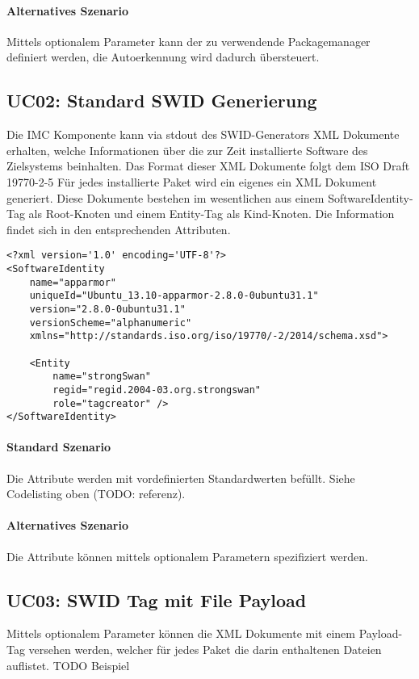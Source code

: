 \paragraph{Alternatives Szenario}
Mittels optionalem Parameter kann der zu verwendende Packagemanager definiert
werden, die Autoerkennung wird dadurch übersteuert.

\subsection{UC02: Standard SWID Generierung}

Die IMC Komponente kann via stdout des SWID-Generators XML Dokumente erhalten, welche Informationen über die zur Zeit installierte Software des Zielsystems beinhalten.
Das Format dieser XML Dokumente folgt dem ISO Draft 19770-2-5
Für jedes installierte Paket wird ein eigenes ein XML Dokument generiert.
Diese Dokumente bestehen im wesentlichen aus einem SoftwareIdentity-Tag als Root-Knoten und einem Entity-Tag als Kind-Knoten. Die Information findet sich in den entsprechenden Attributen.

\begin{verbatim}
<?xml version='1.0' encoding='UTF-8'?>
<SoftwareIdentity
    name="apparmor"
    uniqueId="Ubuntu_13.10-apparmor-2.8.0-0ubuntu31.1"
    version="2.8.0-0ubuntu31.1"
    versionScheme="alphanumeric"
    xmlns="http://standards.iso.org/iso/19770/-2/2014/schema.xsd">

    <Entity
        name="strongSwan"
        regid="regid.2004-03.org.strongswan"
        role="tagcreator" />
</SoftwareIdentity>
\end{verbatim}

\paragraph{Standard Szenario}
Die Attribute werden mit vordefinierten Standardwerten befüllt. Siehe Codelisting oben (TODO: referenz).

\paragraph{Alternatives Szenario}
Die Attribute können mittels optionalem Parametern spezifiziert werden.

\subsection{UC03: SWID Tag mit File Payload}
Mittels optionalem Parameter können die XML Dokumente mit einem Payload-Tag versehen werden, welcher für jedes Paket die darin enthaltenen Dateien auflistet.
TODO Beispiel

